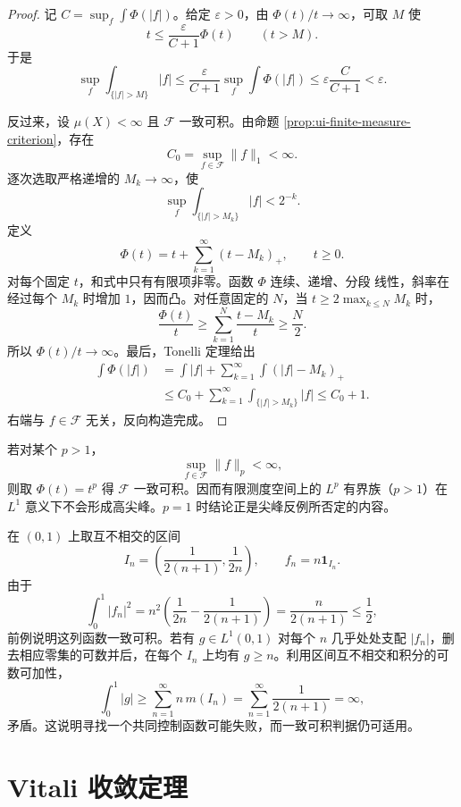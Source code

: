 \begin{proof}
记 \(C=\sup_f\int\Phi(|f|)\)。给定 \(\varepsilon>0\)，由
\(\Phi(t)/t\to\infty\)，可取 \(M\) 使
\[
 t\le\frac{\varepsilon}{C+1}\Phi(t)\qquad(t>M).
\]
于是
\[
 \sup_f\int_{\{|f|>M\}}|f|
 \le\frac{\varepsilon}{C+1}\sup_f\int\Phi(|f|)
 \le\varepsilon\frac C{C+1}<\varepsilon.
\]

反过来，设 \(\mu(X)<\infty\) 且 \(\mathcal F\) 一致可积。由命题
\ref{prop:ui-finite-measure-criterion}，存在
\[
 C_0=\sup_{f\in\mathcal F}\|f\|_1<\infty.
\]
逐次选取严格递增的 \(M_k\to\infty\)，使
\[
 \sup_f\int_{\{|f|>M_k\}}|f|<2^{-k}.
\]
定义
\[
 \Phi(t)=t+\sum_{k=1}^{\infty}(t-M_k)_+,
 \qquad t\ge0.
\]
对每个固定 \(t\)，和式中只有有限项非零。函数 \(\Phi\) 连续、递增、分段
线性，斜率在经过每个 \(M_k\) 时增加 \(1\)，因而凸。对任意固定的
\(N\)，当 \(t\ge2\max_{k\le N}M_k\) 时，
\[
 \frac{\Phi(t)}t
 \ge\sum_{k=1}^{N}\frac{t-M_k}{t}\ge\frac N2.
\]
所以 \(\Phi(t)/t\to\infty\)。最后，Tonelli 定理给出
\[
 \begin{split}
 \int\Phi(|f|)
 &=\int|f|+\sum_{k=1}^{\infty}\int(|f|-M_k)_+\\
 &\le C_0+\sum_{k=1}^{\infty}
       \int_{\{|f|>M_k\}}|f|
 \le C_0+1.
 \end{split}
\]
右端与 \(f\in\mathcal F\) 无关，反向构造完成。
\end{proof}

\begin{example}
若对某个 \(p>1\)，
\[
 \sup_{f\in\mathcal F}\|f\|_p<\infty,
\]
则取 \(\Phi(t)=t^p\) 得 \(\mathcal F\) 一致可积。因而有限测度空间上的
\(L^p\) 有界族（\(p>1\)）在 \(L^1\) 意义下不会形成高尖峰。\(p=1\)
时结论正是尖峰反例所否定的内容。
\end{example}

\begin{example}[没有共同可积控制函数的一致可积列]
在 \((0,1)\) 上取互不相交的区间
\[
 I_n=\left(\frac1{2(n+1)},\frac1{2n}\right),\qquad
 f_n=n\mathbf1_{I_n}.
\]
由于
\[
 \int_0^1 |f_n|^2
 =n^2\left(\frac1{2n}-\frac1{2(n+1)}\right)
 =\frac{n}{2(n+1)}\le\frac12,
\]
前例说明这列函数一致可积。若有 \(g\in L^1(0,1)\) 对每个 \(n\)
几乎处处支配 \(|f_n|\)，删去相应零集的可数并后，在每个 \(I_n\)
上均有 \(g\ge n\)。利用区间互不相交和积分的可数可加性，
\[
 \int_0^1 |g|\ge\sum_{n=1}^{\infty}n\,m(I_n)
 =\sum_{n=1}^{\infty}\frac1{2(n+1)}=\infty,
\]
矛盾。这说明寻找一个共同控制函数可能失败，而一致可积判据仍可适用。
\end{example}

\section{Vitali 收敛定理}

